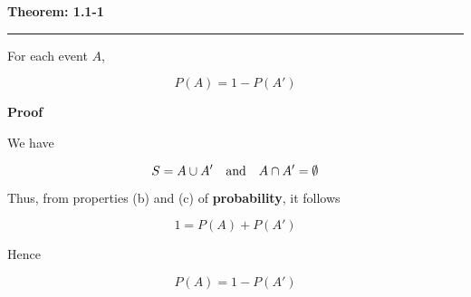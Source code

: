 \nopagenumbers
{\bf Theorem: 1.1-1}
\vskip 1mm
\hrule

\vskip 6pt
For each event $A$,

$$P(A)=1-P(A')$$

\vskip 10pt
{\bf Proof}

\vskip 6pt
We have

$$S=A\cup A'\quad\hbox{and}\quad A\cap A'=\emptyset$$

Thus, from properties (b) and (c) of {\bf probability}, it follows

$$1=P(A)+P(A')$$

Hence

$$P(A)=1-P(A')$$

\vfill\eject
\bye
